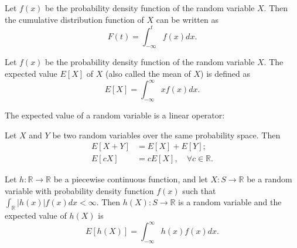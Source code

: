 \begin{lemma}
    Let $ f(x) $ be the probability density function of the random variable
        $ X $.
    Then the cumulative distribution function of $ X $ can be written as
    \begin{equation}
        F(t) = \int_{-\infty}^{t} f(x) dx.
        \label{eq:cumulative-distribution-function}
    \end{equation}
\end{lemma}

\begin{definition}
    Let $ f(x) $ be the probability density function of the random variable
        $ X $.
    The expected value $ E[X] $ of $ X $ (also called the mean of $ X $) is
        defined as
    \begin{equation}
        E[X] = \int_{-\infty}^{\infty} x f(x) dx.
        \label{eq:continuous-expected-value}
    \end{equation}
\end{definition}
The expected value of a random variable is a linear operator:
\begin{lemma}
    Let $ X $ and $ Y $ be two random variables over the same probability
        space.
    Then
    \begin{align}
        E[X + Y] &= E[X] + E[Y]; \\
        E[cX] &= c E[X], \quad \forall c \in \mathbb{R}.
    \end{align}
\end{lemma}

\begin{lemma}
    Let $ h : \mathbb{R} \rightarrow \mathbb{R} $ be a piecewise continuous
        function, and let $ X : S \rightarrow \mathbb{R} $ be a random
        variable with probability density function $ f(x) $ such that
        $ \int_{\mathbb{R}} | h(x) | f(x) dx < \infty $.
    Then $ h(X) : S \rightarrow \mathbb{R} $ is a random variable and the
        expected value of $ h(X) $ is
    \begin{equation}
        E[h(X)] = \int_{-\infty}^{\infty} h(x) f(x) dx.
        \label{eq:piecewise-continuous-expected-value}
    \end{equation}
\end{lemma}

